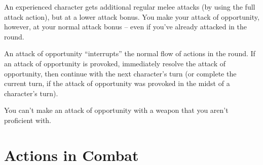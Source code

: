 An experienced character gets additional regular melee attacks (by using the full attack action), but at a lower attack bonus. You make your attack of opportunity, however, at your normal attack bonus -- even if you've already attacked in the round.

An attack of opportunity ``interrupts'' the normal flow of actions in the round. If an attack of opportunity is provoked, immediately resolve the attack of opportunity, then continue with the next character's turn (or complete the current turn, if the attack of opportunity was provoked in the midst of a character's turn).

 You can't make an attack of opportunity with a weapon that you aren't proficient with.

\section{Actions in Combat}

